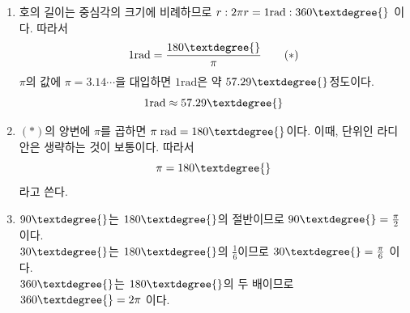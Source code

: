 \documentclass{oblivoir}
\begin{document}
\newpage
%
\rema{}
\begin{enumerate}\label{rad3}
\item
호의 길이는 중심각의 크기에 비례하므로
\(r:2\pi r=1\text{rad}:360\textdegree{}\)
이다.
따라서
\[1\text{rad}=\frac{180\textdegree{}}{\pi}\tag{$*$}\]
\(\pi\)의 값에 \(\pi=3.14\cdots\)을 대입하면 \(1\text{rad}\)은 약 \(57.29\textdegree{}\)정도이다.
\[1\text{rad}\approx57.29\textdegree{}\]
\item
\((*)\)의 양변에 \(\pi\)를 곱하면 \(\pi\;\text{rad}=180\textdegree{}\)이다.
이때, 단위인 라디안은 생략하는 것이 보통이다.
따라서
\[\pi=180\textdegree{}\]
라고 쓴다.
\item
\(90\textdegree{}\)는 \(180\textdegree{}\)의 절반이므로
\(90\textdegree{}=\frac{\pi}2\)
이다.\\
\(30\textdegree{}\)는 \(180\textdegree{}\)의 \(\frac16\)이므로
\(30\textdegree{}=\frac{\pi}6\)
이다.\\
\(360\textdegree{}\)는 \(180\textdegree{}\)의 두 배이므로
\(360\textdegree{}=2\pi\)
이다.
\end{enumerate}

%
\label{rad4}
\par\noindent
{}


\end{document}
